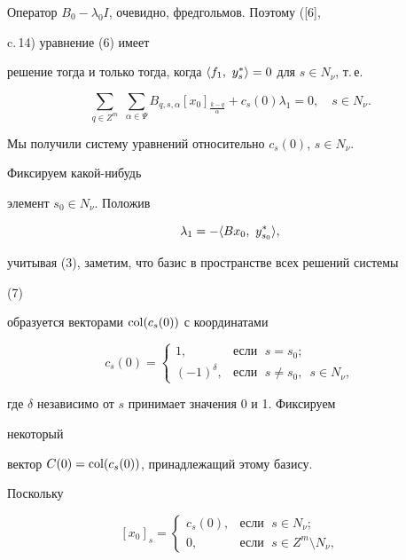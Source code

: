Оператор $B_0-\lambda_0I$, очевидно, фредгольмов. Поэтому ([6], 


c.\,14) уравнение (6) имеет 


решение тогда и только тогда, когда $\la f_1,\ y^*_s\ra=0$ для $s\in 


N_\nu$, т.\,е. 


\begin{equation} 


\sum_{q\in Z^m}\; \sum_{\alpha\in \Psi}B_{q,s,\alpha} 


[x_0]_{\frac{k-q}{\alpha}}+c_s(0)\lambda_1=0,\quad s\in N_\nu. 


\end{equation} 


Мы получили систему уравнений относительно $c_s(0)$, $s\in N_\nu$. 


Фиксируем какой-нибудь 


элемент $s_0\in N_\nu$. Положив 


\begin{equation} 


\lambda_1=-\la B x_0,\ y^*_{s_0}\ra, 


\end{equation} 


учитывая (3), заметим, что базис в пространстве всех решений системы 


(7) 


образуется векторами $\operatorname{col}(c_s(0))$ с координатами 


$$ 


c_s(0)= 


\begin{cases} 


1, & \text{если }\; s=s_0;\\ 


(-1)^\delta, &\text{если }\; s\ne s_0,\ \; s\in N_\nu, 


\end{cases} 


$$ 


где $\delta$ независимо от $s$ принимает значения 0 и 1. Фиксируем 


некоторый 


вектор $C(0)=\operatorname{col}(c_s(0))$, принадлежащий этому базису. 


Поскольку 


\begin{equation} 


[x_0]_s= 


\begin{cases} 


c_s(0), & \text{если }\; s\in N_\nu;\\ 


0, & \text{если }\; s\in Z^m\setminus N_\nu, 


\end{cases} 


\end{equation} 


